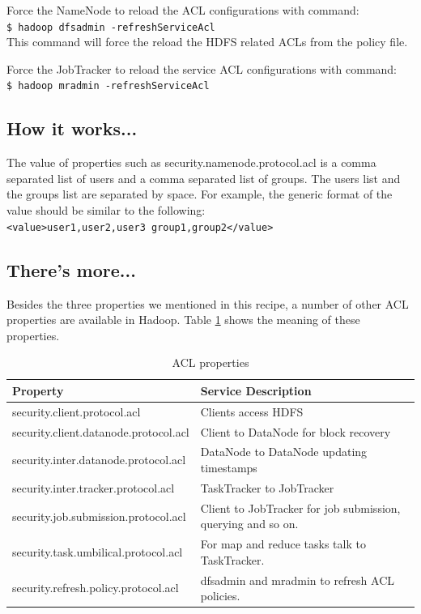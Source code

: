Force the NameNode to reload the ACL configurations with command: \\
\verb|$ hadoop dfsadmin -refreshServiceAcl| \\

This command will force the reload the HDFS related ACLs from the policy file.

Force the JobTracker to reload the service ACL configurations with command: \\
\verb|$ hadoop mradmin -refreshServiceAcl|

\subsection*{How it works...}
The value of properties such as security.namenode.protocol.acl is a comma separated list of users and a comma separated list of groups. The users list and the groups list are separated by space. For example, the generic format of the value should be similar to the following: \\
\verb|<value>user1,user2,user3 group1,group2</value>|

\subsection*{There's more...}
Besides the three properties we mentioned in this recipe, a number of other ACL properties are available in Hadoop. Table \ref{tbl:acl} shows the meaning of these properties.
\begin{table}
  \centering
  \small
  \begin{tabular}{ll}
    \toprule
    Property & Service Description \\ \midrule
    security.client.protocol.acl & Clients access HDFS \\
    security.client.datanode.protocol.acl & Client to DataNode for block recovery \\
    security.inter.datanode.protocol.acl & DataNode to DataNode updating timestamps \\
    security.inter.tracker.protocol.acl & TaskTracker to JobTracker \\
    security.job.submission.protocol.acl & Client to JobTracker for job submission, querying and so on. \\
    security.task.umbilical.protocol.acl & For map and reduce tasks talk to TaskTracker. \\
    security.refresh.policy.protocol.acl & dfsadmin and mradmin to refresh ACL policies. \\ \bottomrule
  \end{tabular}
  \caption{ACL properties}\label{tbl:acl}
\end{table}

